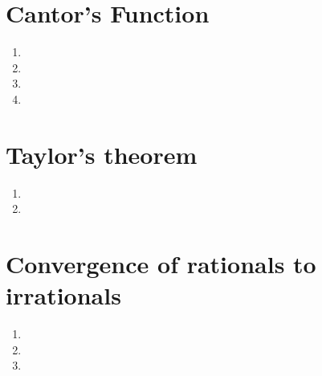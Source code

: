 \documentclass[paper=a4, fontsize=11pt]{scrartcl} %
\numberwithin{equation}{section} %
\numberwithin{figure}{section} %
\numberwithin{table}{section} %
\begin{document}
\section{Cantor's Function}
	\begin{enumerate}
		\item
	
		\item
	
		\item 
		
		\item 
		
	\end{enumerate}


\section{Taylor's theorem}
	\begin{enumerate}
		\item 

		\item 
		
	\end{enumerate}


\section{Convergence of rationals to irrationals}
	\begin{enumerate}
		\item
	
		\item
		
		\item
		
	\end{enumerate}
\end{document}
